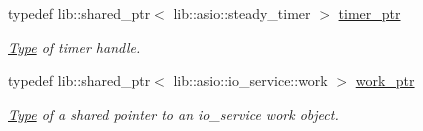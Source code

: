 \begin{DoxyCompactItemize}
typedef lib\+::shared\+\_\+ptr$<$ lib\+::asio\+::steady\+\_\+timer $>$ \mbox{\hyperlink{classwebsocketpp_1_1transport_1_1asio_1_1endpoint_a1802f5762009dbed117ff793fa87468f}{timer\+\_\+ptr}}
\begin{DoxyCompactList}\small\item\em \mbox{\hyperlink{struct_type}{Type}} of timer handle. \end{DoxyCompactList}\item 
\mbox{\label{classwebsocketpp_1_1transport_1_1asio_1_1endpoint_ac730e8330bb982f9144127e9d66d0a23}} 
typedef lib\+::shared\+\_\+ptr$<$ lib\+::asio\+::io\+\_\+service\+::work $>$ \mbox{\hyperlink{classwebsocketpp_1_1transport_1_1asio_1_1endpoint_ac730e8330bb982f9144127e9d66d0a23}{work\+\_\+ptr}}
\begin{DoxyCompactList}\small\item\em \mbox{\hyperlink{struct_type}{Type}} of a shared pointer to an io\+\_\+service work object. \end{DoxyCompactList}\end{DoxyCompactItemize}
